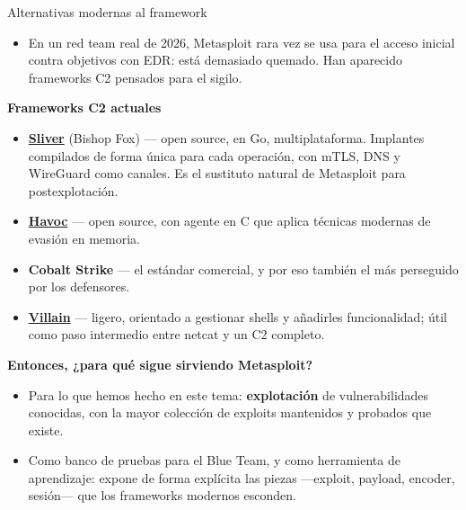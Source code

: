 \documentclass[aspectratio=169,11pt]{beamer}
\newcommand{\lead}[1]{{\color{uznavy}\bfseries #1}\par\smallskip}
\begin{document}
\begin{frame}{Alternativas modernas al framework}
\footnotesize
  \begin{itemize}
  \item En un red team real de 2026, Metasploit rara vez se usa para el acceso inicial contra objetivos con EDR: está demasiado quemado. Han aparecido frameworks C2 pensados para el sigilo.
  \end{itemize}
\lead{Frameworks C2 actuales}
  \begin{itemize}\setlength{\itemsep}{0.3em}
  \item \href{https://github.com/BishopFox/sliver}{\textbf{Sliver}} (Bishop Fox) --- open source, en Go, multiplataforma. Implantes compilados de forma única para cada operación, con mTLS, DNS y WireGuard como canales. Es el sustituto natural de Metasploit para postexplotación.
  \item \href{https://github.com/HavocFramework/Havoc}{\textbf{Havoc}} --- open source, con agente en C que aplica técnicas modernas de evasión en memoria.
  \item \textbf{Cobalt Strike} --- el estándar comercial, y por eso también el más perseguido por los defensores.
  \item \href{https://github.com/t3l3machus/Villain}{\textbf{Villain}} --- ligero, orientado a gestionar shells y añadirles funcionalidad; útil como paso intermedio entre netcat y un C2 completo.
  \end{itemize}
\lead{Entonces, ¿para qué sigue sirviendo Metasploit?}
  \begin{itemize}
  \item Para lo que hemos hecho en este tema: \textbf{explotación} de vulnerabilidades conocidas, con la mayor colección de exploits mantenidos y probados que existe.
  \item Como banco de pruebas para el Blue Team, y como herramienta de aprendizaje: expone de forma explícita las piezas ---exploit, payload, encoder, sesión--- que los frameworks modernos esconden.
  \end{itemize}
\end{frame}
\end{document}
